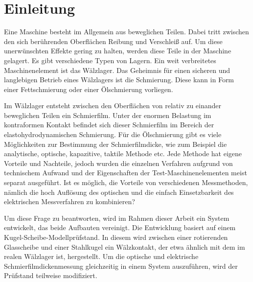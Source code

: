 \chapter{Einleitung}
\label{chap:einleitung}

Eine Maschine besteht im Allgemein aus beweglichen Teilen.
Dabei tritt zwischen den sich berührenden Oberflächen Reibung und Verschleiß auf.
Um diese unerwünschten Effekte gering zu halten, werden diese Teile in der Maschine gelagert.
Es gibt verschiedene Typen von Lagern.
Ein weit verbreitetes Maschinenelement ist das Wälzlager.
Das Geheimnis für einen sicheren und langlebigen Betrieb eines Wälzlagers ist die Schmierung.
Diese kann in Form einer Fettschmierung oder einer Ölschmierung vorliegen.

Im Wälzlager entsteht zwischen den Oberflächen von relativ zu einander beweglichen Teilen ein Schmierfilm.
Unter der enormen Belastung im kontraformen Kontakt befindet sich dieser Schmierfilm im Bereich der elastohydrodynamischen Schmierung.
Für die Ölschmierung gibt es viele Möglichkeiten zur Bestimmung der Schmierfilmdicke, wie zum Beispiel die analytische, optische, kapazitive, taktile Methode etc.
Jede Methode hat eigene Vorteile und Nachteile, jedoch wurden die einzelnen Verfahren aufgrund von technischem Aufwand und der Eigenschaften der Test-Maschinenelementen meist separat ausgeführt.
Ist es möglich, die Vorteile von verschiedenen Messmethoden, nämlich die hoch Auflösung des optischen und die einfach Einsetzbarkeit des elektrischen Messverfahren zu kombinieren?

Um diese Frage zu beantworten, wird im Rahmen dieser Arbeit ein System entwickelt, das beide Aufbauten vereinigt.
Die Entwicklung basiert auf einem Kugel-Scheibe-Modellprüfstand.
In diesem wird zwischen einer rotierenden Glasscheibe und einer Stahlkugel ein Wälzkontakt, der etwa ähnlich mit dem im realen Wälzlager ist, hergestellt.
Um die optische und elektrische Schmierfilmdickenmessung gleichzeitig in einem System auszuführen, wird der Prüfstand teilweise modifiziert.

